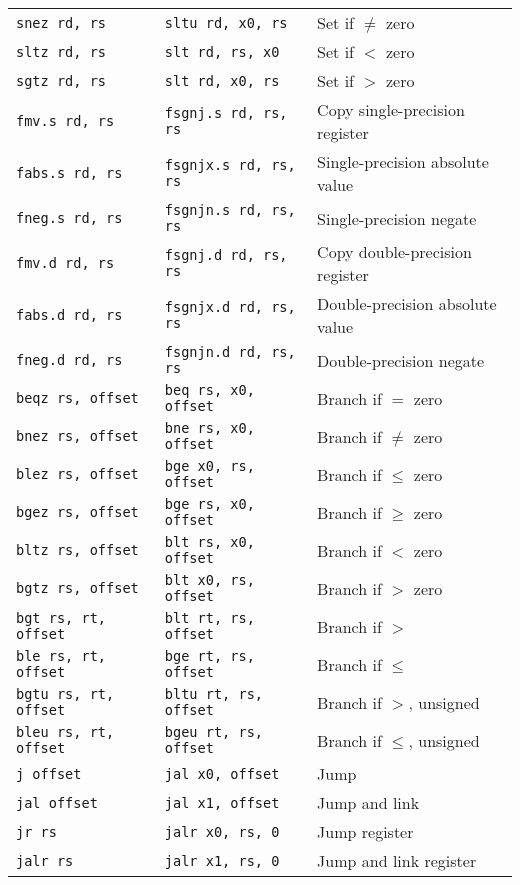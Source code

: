 \begin{tabular}{l | l | l}
{\tt snez rd, rs} & {\tt sltu rd, x0, rs} & Set if $\neq$ zero \\
{\tt sltz rd, rs} & {\tt slt rd, rs, x0} & Set if $<$ zero \\
{\tt sgtz rd, rs} & {\tt slt rd, x0, rs} & Set if $>$ zero \\
\hline
{\tt fmv.s rd, rs} & {\tt fsgnj.s rd, rs, rs} & Copy single-precision register \\
{\tt fabs.s rd, rs} & {\tt fsgnjx.s rd, rs, rs} & Single-precision absolute value \\
{\tt fneg.s rd, rs} & {\tt fsgnjn.s rd, rs, rs} & Single-precision negate \\
{\tt fmv.d rd, rs} & {\tt fsgnj.d rd, rs, rs} & Copy double-precision register \\
{\tt fabs.d rd, rs} & {\tt fsgnjx.d rd, rs, rs} & Double-precision absolute value \\
{\tt fneg.d rd, rs} & {\tt fsgnjn.d rd, rs, rs} & Double-precision negate \\
\hline
{\tt beqz rs, offset} & {\tt beq rs, x0, offset} & Branch if $=$ zero \\
{\tt bnez rs, offset} & {\tt bne rs, x0, offset} & Branch if $\neq$ zero \\
{\tt blez rs, offset} & {\tt bge x0, rs, offset} & Branch if $\leq$ zero \\
{\tt bgez rs, offset} & {\tt bge rs, x0, offset} & Branch if $\geq$ zero \\
{\tt bltz rs, offset} & {\tt blt rs, x0, offset} & Branch if $<$ zero \\
{\tt bgtz rs, offset} & {\tt blt x0, rs, offset} & Branch if $>$ zero \\
\hline
{\tt bgt rs, rt, offset} & {\tt blt rt, rs, offset} & Branch if $>$ \\
{\tt ble rs, rt, offset} & {\tt bge rt, rs, offset} & Branch if $\leq$ \\
{\tt bgtu rs, rt, offset} & {\tt bltu rt, rs, offset} & Branch if $>$, unsigned \\
{\tt bleu rs, rt, offset} & {\tt bgeu rt, rs, offset} & Branch if $\leq$, unsigned \\
\hline
{\tt j offset} & {\tt jal x0, offset} & Jump \\
{\tt jal offset} & {\tt jal x1, offset} & Jump and link \\
{\tt jr rs} & {\tt jalr x0, rs, 0} & Jump register \\
{\tt jalr rs} & {\tt jalr x1, rs, 0} & Jump and link register \\

\end{tabular}
